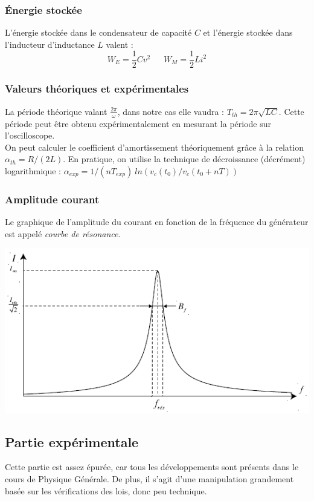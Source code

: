 \documentclass	[11pt, a4paper, openany]{book}
\begin{document}
		\subsubsection*{Énergie stockée}
		L'énergie stockée dans le condensateur de capacité $C$ et l'énergie stockée dans l'inducteur d'inductance $L$ valent : 
		\begin{equation}
			W_E = \frac{1}{2}Cv^2\ \ \ \ \ \ \ W_M = \frac{1}{2}Li^2
		\end{equation}
		
		\subsubsection*{Valeurs théoriques et expérimentales}
		La période théorique valant $\frac{2\pi}{\omega}$, dans notre cas elle vaudra : $T_{th} = 2\pi\sqrt{LC}$. Cette période peut être obtenu expérimentalement en mesurant la période sur l'oscilloscope.\\
		
		On peut calculer le coefficient d'amortissement théoriquement grâce à la relation $\alpha_{th} = R/(2L)$. En pratique, on utilise la technique de décroissance (décrément) logarithmique : $\alpha_{exp} = 1/(nT_{exp})\ ln(v_c(t_0) / v_c(t_0 + nT))$
		
		\subsubsection*{Amplitude courant}
		Le graphique de l'amplitude du courant en fonction de la fréquence du générateur est appelé \textit{courbe de résonance}.
		\begin{center}
			\includegraphics[scale=0.5]{labo/image31.png}
		\end{center}
		
		
		\newpage
		\subsection{Partie expérimentale}
		Cette partie est assez épurée, car tous les développements sont présents dans le cours de Physique Générale. De plus, il s'agit d'une manipulation grandement basée sur les vérifications des lois, donc peu technique.\\
		
\end{document}
